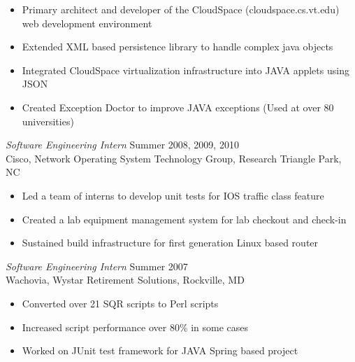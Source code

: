 \documentclass[line,margin]{res}
\begin{document}
\begin{resume}
        \begin{itemize} \itemsep -2pt
            \item Primary architect and developer of the CloudSpace (cloudspace.cs.vt.edu) web development environment
            \item Extended XML based persistence library to handle complex java objects
            \item Integrated CloudSpace virtualization infrastructure into JAVA applets using JSON
            \item Created Exception Doctor to improve JAVA exceptions (Used at over 80 universities)
        \end{itemize}
        {\sl Software Engineering Intern} \hfill  Summer 2008, 2009, 2010 \\
           Cisco, Network Operating System Technology Group, Research Triangle Park, NC
              \begin{itemize}  \itemsep -2pt
                   \item Led a team of interns to develop unit tests for IOS traffic class feature
                   \item Created a lab equipment management system for lab checkout and check-in
                   \item Sustained build infrastructure for first generation Linux based router
              \end{itemize}
        {\sl Software Engineering Intern} \hfill  Summer 2007 \\
           Wachovia, Wystar Retirement Solutions, Rockville, MD
              \begin{itemize}  \itemsep -2pt %
                   \item Converted over 21 SQR scripts to Perl scripts
                   \item Increased script performance over 80\% in some cases
                   \item Worked on JUnit test framework for JAVA Spring based project
              \end{itemize}
 

\end{resume}
\end{document}
